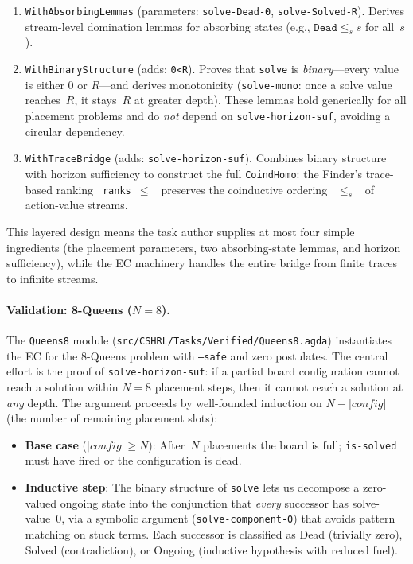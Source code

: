 \documentclass[9pt,a4paper]{article}
\newcommand{\fpath}[1]{\nolinkurl{#1}}
\theoremstyle{plain}
\theoremstyle{definition}
\theoremstyle{remark}
\begin{document}
\begin{enumerate}
\item \texttt{WithAbsorbingLemmas} (parameters: \texttt{solve-Dead-0}, \texttt{solve-Solved-R}).  Derives stream-level domination lemmas for absorbing states (e.g., $\texttt{Dead} \le_s s$ for all~$s$).

\item \texttt{WithBinaryStructure} (adds: \texttt{0\textless{}R}).  Proves that \texttt{solve} is \emph{binary}---every value is either $0$ or $R$---and derives monotonicity (\texttt{solve-mono}: once a solve value reaches~$R$, it stays~$R$ at greater depth).  These lemmas hold generically for all placement problems and do \emph{not} depend on \texttt{solve-horizon-suf}, avoiding a circular dependency.

\item \texttt{WithTraceBridge} (adds: \texttt{solve-horizon-suf}).  Combines binary structure with horizon sufficiency to construct the full \texttt{CoindHomo}: the Finder's trace-based ranking \texttt{\_ranks\_$\le$\_} preserves the coinductive ordering \texttt{\_$\le_s$\_} of action-value streams.
\end{enumerate}

\noindent This layered design means the task author supplies at most four simple ingredients (the placement parameters, two absorbing-state lemmas, and horizon sufficiency), while the EC machinery handles the entire bridge from finite traces to infinite streams.

\paragraph{Validation: 8-Queens ($N = 8$).}
The \texttt{Queens8} module (\fpath{src/CSHRL/Tasks/Verified/Queens8.agda}) instantiates the EC for the $8$-Queens problem with \texttt{--safe} and zero postulates.  The central effort is the proof of \texttt{solve-horizon-suf}: if a partial board configuration cannot reach a solution within $N = 8$ placement steps, then it cannot reach a solution at \emph{any} depth.  The argument proceeds by well-founded induction on $N - |\mathit{config}|$ (the number of remaining placement slots):

\begin{itemize}
\item \textbf{Base case} ($|\mathit{config}| \ge N$): After~$N$ placements the board is full; \texttt{is-solved} must have fired or the configuration is dead.
\item \textbf{Inductive step}: The binary structure of \texttt{solve} lets us decompose a zero-valued ongoing state into the conjunction that \emph{every} successor has solve-value~$0$, via a symbolic argument (\texttt{solve-component-0}) that avoids pattern matching on stuck terms.  Each successor is classified as Dead (trivially zero), Solved (contradiction), or Ongoing (inductive hypothesis with reduced fuel).
\end{itemize}
\end{document}
